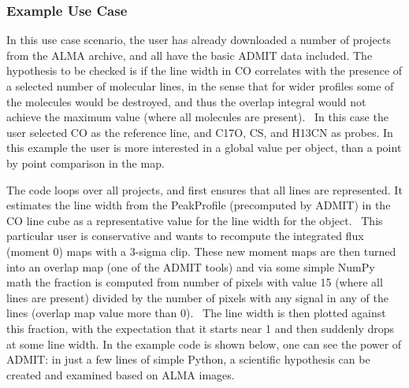 \subsubsection{Example Use Case}

In this use case scenario, the user has already downloaded a number of projects from the ALMA archive, and all have the basic ADMIT data included. The hypothesis to be checked is if the line width in CO correlates with the presence of a selected number of molecular lines, in the sense that for wider profiles some of the molecules would be destroyed, and thus the overlap integral would not achieve the maximum value (where all molecules are present).  In this case the user selected CO as the reference line, and C17O, CS, and H13CN as probes. In this example the user is more interested in a global value per object, than a point by point comparison in the map.

The code loops over all projects, and first ensures that all lines are represented. It estimates the line width from the PeakProfile (precomputed by ADMIT) in the CO line cube as a representative value for the line width for the object.  This particular user is conservative and wants to recompute the integrated flux (moment 0) maps with a 3-sigma clip. These new moment maps are then turned into an overlap map (one of the ADMIT tools) and via some simple NumPy math the fraction is computed from number of pixels with value 15 (where all lines are present) divided by the number of pixels with any signal in any of the lines (overlap map value more than 0).  The line width is then plotted against this fraction, with the expectation that it starts near 1 and then suddenly drops at some line width.   In the example code is shown below, one can see the power of ADMIT:  in just a few lines of simple Python, a scientific hypothesis can be created and examined based on ALMA images.

